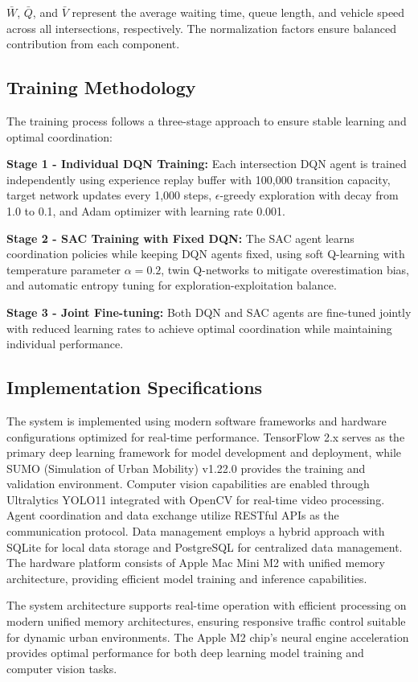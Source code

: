 $\bar{W}$, $\bar{Q}$, and $\bar{V}$ represent the average waiting time, queue length, and vehicle speed across all intersections, respectively. The normalization factors ensure balanced contribution from each component.

\subsection{Training Methodology}\label{subsec2a-5}

The training process follows a three-stage approach to ensure stable learning and optimal coordination:

\textbf{Stage 1 - Individual DQN Training:} Each intersection DQN agent is trained independently using experience replay buffer with 100,000 transition capacity, target network updates every 1,000 steps, $\epsilon$-greedy exploration with decay from 1.0 to 0.1, and Adam optimizer with learning rate 0.001.

\textbf{Stage 2 - SAC Training with Fixed DQN:} The SAC agent learns coordination policies while keeping DQN agents fixed, using soft Q-learning with temperature parameter $\alpha = 0.2$, twin Q-networks to mitigate overestimation bias, and automatic entropy tuning for exploration-exploitation balance.

\textbf{Stage 3 - Joint Fine-tuning:} Both DQN and SAC agents are fine-tuned jointly with reduced learning rates to achieve optimal coordination while maintaining individual performance.

\subsection{Implementation Specifications}\label{subsec2a-6}

The system is implemented using modern software frameworks and hardware configurations optimized for real-time performance. TensorFlow 2.x serves as the primary deep learning framework for model development and deployment, while SUMO (Simulation of Urban Mobility) v1.22.0 provides the training and validation environment. Computer vision capabilities are enabled through Ultralytics YOLO11 integrated with OpenCV for real-time video processing. Agent coordination and data exchange utilize RESTful APIs as the communication protocol. Data management employs a hybrid approach with SQLite for local data storage and PostgreSQL for centralized data management. The hardware platform consists of Apple Mac Mini M2 with unified memory architecture, providing efficient model training and inference capabilities.

The system architecture supports real-time operation with efficient processing on modern unified memory architectures, ensuring responsive traffic control suitable for dynamic urban environments. The Apple M2 chip's neural engine acceleration provides optimal performance for both deep learning model training and computer vision tasks.
